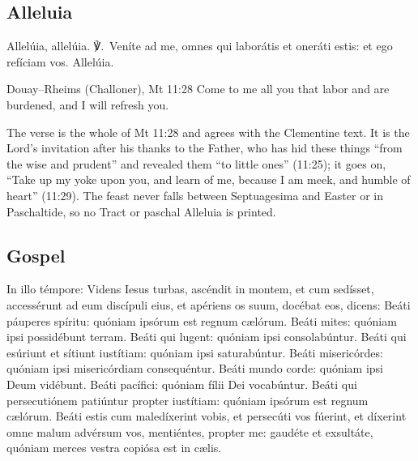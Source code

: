 \subsection{Alleluia}
\label{proper-alleluia}


\begin{latinproper}
Allelúia, allelúia. ℣.~Veníte ad me, omnes qui laborátis et oneráti estis:
et ego refíciam vos. Allelúia.
\end{latinproper}

\begin{englishwitness}{Douay--Rheims (Challoner), Mt 11:28}
Come to me all you that labor and are burdened, and I will refresh you.
\end{englishwitness}

\noindent The verse is the whole of Mt 11:28 and agrees with the Clementine
text. It is the Lord's invitation after his thanks to the Father, who has hid
these things ``from the wise and prudent'' and revealed them ``to little ones''
(11:25); it goes on, ``Take up my yoke upon you, and learn of me, because I am
meek, and humble of heart'' (11:29). The feast never falls between Septuagesima
and Easter or in Paschaltide, so no Tract or paschal Alleluia is printed.

\subsection{Gospel}
\label{proper-gospel}


\begin{latinproper}
In illo témpore: Videns Iesus turbas, ascéndit in montem, et cum sedísset,
accessérunt ad eum discípuli eius, et apériens os suum, docébat eos,
dicens: Beáti páuperes spíritu: quóniam ipsórum est regnum cælórum. Beáti
mites: quóniam ipsi possidébunt terram. Beáti qui lugent: quóniam ipsi
consolabúntur. Beáti qui esúriunt et sítiunt iustítiam: quóniam ipsi
saturabúntur. Beáti misericórdes: quóniam ipsi misericórdiam consequéntur.
Beáti mundo corde: quóniam ipsi Deum vidébunt. Beáti pacífici: quóniam
fílii Dei vocabúntur. Beáti qui persecutiónem patiúntur propter iustítiam:
quóniam ipsórum est regnum cælórum. Beáti estis cum maledíxerint vobis, et
persecúti vos fúerint, et díxerint omne malum advérsum vos, mentiéntes,
propter me: gaudéte et exsultáte, quóniam merces vestra copiósa est in
cælis.
\end{latinproper}

